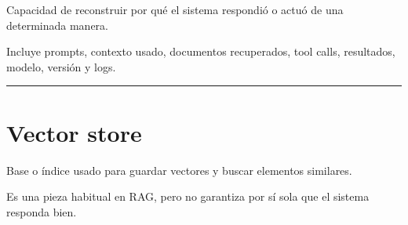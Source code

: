 Capacidad de reconstruir por qué el sistema respondió o actuó de una
determinada manera.

Incluye prompts, contexto usado, documentos recuperados, tool calls,
resultados, modelo, versión y logs.

\begin{center}\rule{0.5\linewidth}{0.5pt}\end{center}

\section{Vector store}\label{vector-store}

Base o índice usado para guardar vectores y buscar elementos similares.

Es una pieza habitual en RAG, pero no garantiza por sí sola que el
sistema responda bien.
